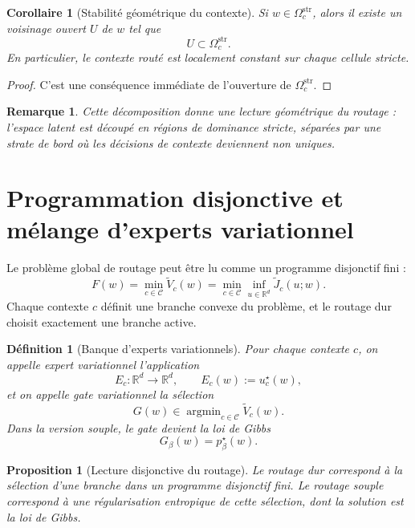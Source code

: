 \documentclass[11pt,a4paper]{article}
\newtheorem{definition}{Définition}[section]
\newtheorem{proposition}{Proposition}[section]
\newtheorem{corollary}{Corollaire}[section]
\newtheorem{remark}{Remarque}[section]
\DeclareMathOperator{\argmin}{argmin}
\newcommand{\R}{\mathbb R}
\newcommand{\Ccal}{\mathcal C}
\begin{document}
\begin{corollary}[Stabilité géométrique du contexte]
Si \(w\in\Omega_c^{\mathrm{str}}\), alors il existe un voisinage ouvert \(U\) de \(w\) tel que
\[
U\subset \Omega_c^{\mathrm{str}}.
\]
En particulier, le contexte routé est localement constant sur chaque cellule stricte.
\end{corollary}

\begin{proof}
C'est une conséquence immédiate de l'ouverture de \(\Omega_c^{\mathrm{str}}\).
\end{proof}

\begin{remark}
Cette décomposition donne une lecture géométrique du routage : l'espace latent est découpé en régions de dominance stricte, séparées par une strate de bord où les décisions de contexte deviennent non uniques.
\end{remark}

\section{Programmation disjonctive et mélange d'experts variationnel}

Le problème global de routage peut être lu comme un programme disjonctif fini :
\[
F(w)=\min_{c\in\Ccal}\widetilde V_c(w)
=
\min_{c\in\Ccal}\inf_{u\in\R^d}\widetilde J_c(u;w).
\]
Chaque contexte \(c\) définit une branche convexe du problème, et le routage dur choisit exactement une branche active.

\begin{definition}[Banque d'experts variationnels]
Pour chaque contexte \(c\), on appelle expert variationnel l'application
\[
E_c:\R^d\to\R^d,\qquad E_c(w):=u_c^\star(w),
\]
et on appelle gate variationnel la sélection
\[
G(w)\in\argmin_{c\in\Ccal}\widetilde V_c(w).
\]
Dans la version souple, le gate devient la loi de Gibbs
\[
G_\beta(w)=p^\star_\beta(w).
\]
\end{definition}

\begin{proposition}[Lecture disjonctive du routage]
Le routage dur correspond à la sélection d'une branche dans un programme disjonctif fini.
Le routage souple correspond à une régularisation entropique de cette sélection, dont la solution est la loi de Gibbs.
\end{proposition}
\end{document}
